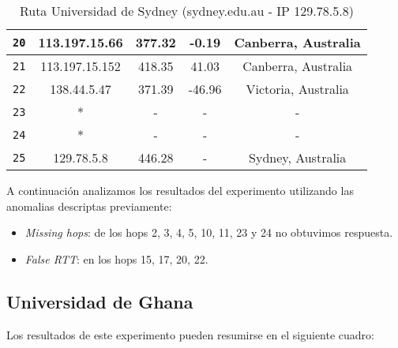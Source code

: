 \begin{table}[ht]
\begin{center}
\begin{tabular}{|c|c|c|c|c|}
    \texttt{20} & 113.197.15.66   & 377.32  & -0.19   & Canberra, Australia   \\ \hline
    \texttt{21} & 113.197.15.152  & 418.35  & 41.03   & Canberra, Australia    \\ \hline
    \texttt{22} & 138.44.5.47     & 371.39  & -46.96  & Victoria, Australia   \\ \hline
    \texttt{23} & *               & -       & -       & -                \\ \hline
    \texttt{24} & *               & -       & -       & -   \\ \hline
    \texttt{25} & 129.78.5.8      & 446.28  & -       & Sydney, Australia   \\ \hline
    \end{tabular}
    \caption{Ruta Universidad de Sydney (sydney.edu.au - IP 129.78.5.8)}
\end{center}\end{table}

\begin{figure}[H]
    \centering
\end{figure}

A continuación analizamos los resultados del experimento utilizando las anomalias descriptas previamente:
\begin{itemize}
    \item \textit{Missing hops}: de los hops 2, 3, 4, 5, 10, 11, 23 y 24 no obtuvimos respuesta.
    \item \textit{False RTT}: en los hops 15, 17, 20, 22.
\end{itemize}

\subsection{Universidad de Ghana}

Los resultados de este experimento pueden resumirse en el siguiente cuadro:

